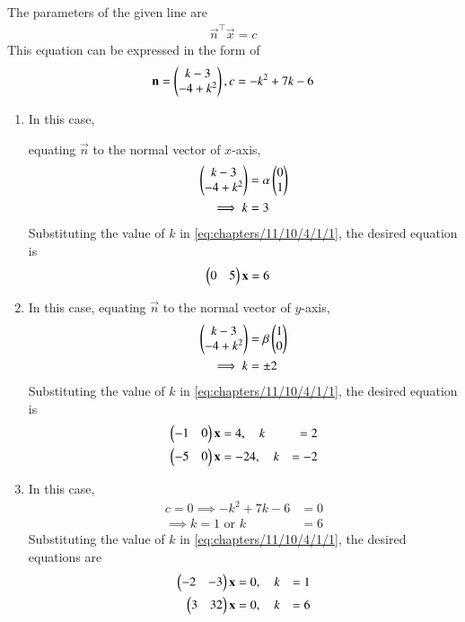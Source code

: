 The parameters of the given line are
\begin{align}
\vec{n}^{\top}\vec{x}=c \label{eq:chapters/11/10/4/1/2}
\end{align}
This equation can be expressed in the form of 
\begin{align}
\mathbf{n} = \begin{pmatrix}k-3\\-4+k^2\end{pmatrix}, c  = -k^2+7k-6
\end{align}
\iffalse
Then \eqref{eq:chapters/11/10/4/1/1} can be expressed as
\begin{align}
\myvec{k-3 & -4+k^2}\vec{x} &=-k^2+7k-6\label{eq:chapters/11/10/4/1/4}
\end{align}
\fi
\begin{enumerate}
    \item 
	    In this case,
	    \iffalse
The normal vector of $x$-axis is given by
\begin{align}
\myvec{0\\1}
\end{align}
\fi
equating $\vec{n}$ to the normal vector of $x$-axis,
\begin{align}
\begin{pmatrix}k-3\\-4+k^2\end{pmatrix} &=\alpha\begin{pmatrix}0\\1\end{pmatrix}\label{eq:chapters/11/10/4/1/6}
\\
\implies
k &=3
\end{align}
Substituting the value of $k$ in \eqref{eq:chapters/11/10/4/1/1}, the desired equation is
\begin{align}
        \begin{pmatrix}0 & 5\end{pmatrix}\mathbf{x} &=6
\end{align}

\item In this case, 
equating $\vec{n}$ to the normal vector of $y$-axis,
\begin{align}
\begin{pmatrix}k-3\\-4+k^2\end{pmatrix} &=\beta\begin{pmatrix}1\\0\end{pmatrix}\label{eq:chapters/11/10/4/1/11}
\\
	\implies k &=\pm2
\end{align}
Substituting the value of $k$ in \eqref{eq:chapters/11/10/4/1/1}, the desired equation is 
\begin{align}
        \begin{pmatrix}-1 & 0\end{pmatrix}\mathbf{x} &=4, \quad  k &=2\\
        \begin{pmatrix}-5 & 0\end{pmatrix}\mathbf{x} &=-24, \quad  k &=-2
\end{align}
\item 
	In this case, 
\begin{align}
	c = 0 \implies 
	-k^2+7k-6 &= 0\\
	\implies k =1 \text{ or } k&=6
\end{align}
Substituting the value of $k$ in \eqref{eq:chapters/11/10/4/1/1}, the desired equations are 
\begin{align}
        \begin{pmatrix}-2 & -3\end{pmatrix}\mathbf{x} &=0, \quad  k &=1\\
       \begin{pmatrix}3 & 32\end{pmatrix}\mathbf{x} &=0, \quad  k &=6
\end{align}
\end{enumerate}
